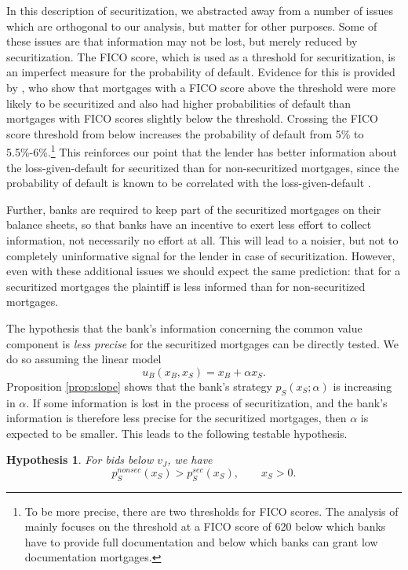 \documentclass[11pt,twopage]{article}
\newtheorem{conjecture}{Hypothesis}
{\bf}{\it}
\begin{document}
In this description of securitization, we abstracted away from a
number of issues which are orthogonal to our analysis, but matter for
other purposes. Some of these issues are that information may not be
lost, but merely reduced by securitization. The FICO score, which is
used as a threshold for securitization, is an imperfect measure for
the probability of default. Evidence for this is provided by \cite{keys2008did}, who show that mortgages with a FICO score above the
threshold were more likely to be securitized and also had higher
probabilities of default than mortgages with FICO scores slightly
below the threshold. Crossing the FICO score threshold from below
increases the probability of default from 5\% to
5.5\%-6\%.\footnote{To be more precise, there are two thresholds for
	FICO scores. The analysis of \cite{keys2008did} mainly focuses on
	the threshold at a FICO score of 620 below which banks have to
	provide full documentation and below which banks can grant low
	documentation mortgages.} This reinforces our point that the lender
has better information about the loss-given-default for securitized
than for non-securitized mortgages, since the probability of default
is known to be correlated with the loss-given-default \cite{qi2009loss}.

Further, banks are required to keep part
of the securitized mortgages on their balance sheets, so that banks
have an incentive to exert less effort to collect information, not
necessarily no effort at all. This will lead to a noisier, but not to
completely uninformative signal for the lender in case of securitization. However, even with these additional issues we should expect the same prediction: that for a securitized mortgages the plaintiff is less informed than for non-securitized mortgages.

The hypothesis that the bank's information concerning the common value component is \emph{less precise} for the securitized mortgages can be directly tested. We do so assuming the linear model \[u_B(x_B,x_S) = x_B+\alpha x_S .\] Proposition \ref{prop:slope} shows that the bank's strategy $p_S(x_S;\alpha)$ is increasing in $\alpha$. 
If some information is lost in the process of securitization, and the bank's information is therefore less precise for the securitized mortgages, then $\alpha$ is expected to be smaller. This leads to the following testable hypothesis.
%


\begin{conjecture}\label{hyp:slope}
	For bids below $v_J$, we have \[ p_S^{nonsec}(x_S) > p_S^{sec}(x_S), \quad\quad x_S>0 .\] \end{conjecture}
\end{document}
